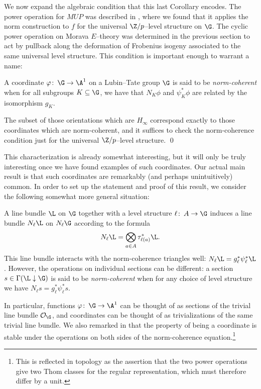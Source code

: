 We now expand the algebraic condition that this last Corollary encodes.  The power operation for $MUP$ was described in , where we found that it applies the norm construction to $f$ for the universal $\Z/p$--level structure on $\G$.  The cyclic power operation on Morava $E$--theory was determined in the previous section to act by pullback along the deformation of Frobenius isogeny associated to the same universal level structure.  This condition is important enough to warrant a name:

\begin{definition}\label{NormCoherentDefn}
A coordinate $\phi\co \G \to \A^1$ on a Lubin--Tate group $\G$ is said to be \textit{norm-coherent} when for all subgroups $K \subseteq \G$, we have that $N_K \phi$ and $\psi_K^* \phi$ are related by the isomorphism $g_K$.
\end{definition}

\begin{corollary}
The subset of those orientations which are $H_\infty$ correspond exactly to those coordinates which are norm-coherent, and it suffices to check the norm-coherence condition just for the universal $\Z/p$--level structure. \qed
\end{corollary}

This characterization is already somewhat interesting, but it will only be truly interesting once we have found examples of such coordinates.  Our actual main result is that such coordinates are remarkably (and perhaps unintuitively) common.  In order to set up the statement and proof of this result, we consider the following somewhat more general situation:

\begin{definition}
A line bundle $\L$ on $\G$ together with a level structure $\ell\co A \to \G$ induces a line bundle $N_\ell \L$ on $N_\ell \G$ according to the formula \[N_\ell \L = \bigotimes_{a \in A} \tau_{\ell(a)}^* \L.\]  This line bundle interacts with the norm-coherence triangles well: $N_\ell \L = g_\ell^* \psi_\ell^* \L$.  However, the operations on individual sections can be different: a section $s \in \Gamma(\L \downarrow \G)$ is said to be \textit{norm-coherent} when for any choice of level structure we have $N_\ell s = g_\ell^* \psi_\ell^* s$.
\end{definition}

\begin{example}
In particular, functions $\phi\co \G \to \A^1$ can be thought of as sections of the trivial line bundle $\sheaf O_{\G}$, and coordinates can be thought of as trivializations of the same trivial line bundle.  We also remarked in  that the property of being a coordinate is stable under the operations on both sides of the norm-coherence equation.\footnote{This is reflected in topology as the assertion that the two power operations give two Thom classes for the regular representation, which must therefore differ by a unit.}
\end{example}

